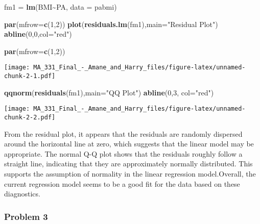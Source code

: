 \documentclass[
]{article}
\newenvironment{Shaded}{\begin{snugshade}}{\end{snugshade}}
\newcommand{\AttributeTok}[1]{\textcolor[rgb]{0.13,0.29,0.53}{#1}}
\newcommand{\DecValTok}[1]{\textcolor[rgb]{0.00,0.00,0.81}{#1}}
\newcommand{\FunctionTok}[1]{\textcolor[rgb]{0.13,0.29,0.53}{\textbf{#1}}}
\newcommand{\NormalTok}[1]{#1}
\newcommand{\OtherTok}[1]{\textcolor[rgb]{0.56,0.35,0.01}{#1}}
\newcommand{\SpecialCharTok}[1]{\textcolor[rgb]{0.81,0.36,0.00}{\textbf{#1}}}
\newcommand{\StringTok}[1]{\textcolor[rgb]{0.31,0.60,0.02}{#1}}
\begin{document}
\begin{Shaded}
\begin{Highlighting}[]
\NormalTok{fm1 }\OtherTok{=} \FunctionTok{lm}\NormalTok{(BMI}\SpecialCharTok{\textasciitilde{}}\NormalTok{PA, }\AttributeTok{data =}\NormalTok{ pabmi)}

\FunctionTok{par}\NormalTok{(}\AttributeTok{mfrow=}\FunctionTok{c}\NormalTok{(}\DecValTok{1}\NormalTok{,}\DecValTok{2}\NormalTok{))}
\FunctionTok{plot}\NormalTok{(}\FunctionTok{residuals.lm}\NormalTok{(fm1),}\AttributeTok{main=}\StringTok{"Residual Plot"}\NormalTok{)}
\FunctionTok{abline}\NormalTok{(}\DecValTok{0}\NormalTok{,}\DecValTok{0}\NormalTok{,}\AttributeTok{col=}\StringTok{"red"}\NormalTok{)}

\FunctionTok{par}\NormalTok{(}\AttributeTok{mfrow=}\FunctionTok{c}\NormalTok{(}\DecValTok{1}\NormalTok{,}\DecValTok{2}\NormalTok{))}
\end{Highlighting}
\end{Shaded}

\texttt{[image: MA\_331\_Final\_-\_Amane\_and\_Harry\_files/figure-latex/unnamed-chunk-2-1.pdf]}

\begin{Shaded}
\begin{Highlighting}[]
\FunctionTok{qqnorm}\NormalTok{(}\FunctionTok{residuals}\NormalTok{(fm1),}\AttributeTok{main=}\StringTok{"QQ Plot"}\NormalTok{)}
\FunctionTok{abline}\NormalTok{(}\DecValTok{0}\NormalTok{,}\DecValTok{3}\NormalTok{, }\AttributeTok{col=}\StringTok{"red"}\NormalTok{)}
\end{Highlighting}
\end{Shaded}

\texttt{[image: MA\_331\_Final\_-\_Amane\_and\_Harry\_files/figure-latex/unnamed-chunk-2-2.pdf]}

From the residual plot, it appears that the residuals are randomly
dispersed around the horizontal line at zero, which suggests that the
linear model may be appropriate. The normal Q-Q plot shows that the
residuals roughly follow a straight line, indicating that they are
approximately normally distributed. This supports the assumption of
normality in the linear regression model.Overall, the current regression
model seems to be a good fit for the data based on these diagnostics.

\hypertarget{problem-3}{%
\subsubsection{Problem 3}\label{problem-3}}
\end{document}
